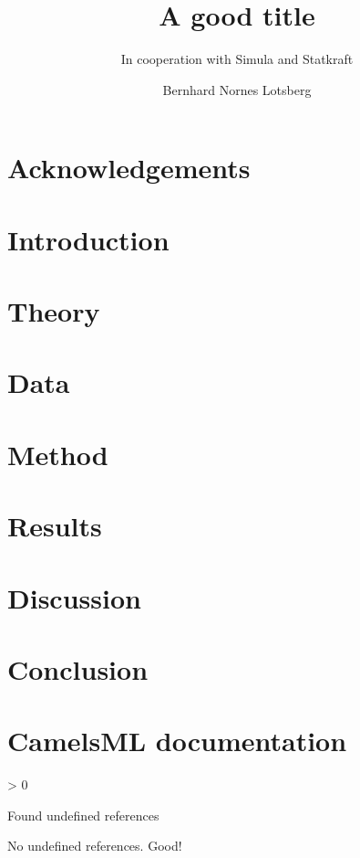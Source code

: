 \documentclass[10pt,a4paper,english, twoside]{report}
\title{A good title}
\subtitle{In cooperation with Simula and Statkraft}
\author{Bernhard Nornes Lotsberg}
\newcounter{undefinedreferences}
\newcommand{\checkreferences}{
	\ifnum\value{undefinedreferences} > 0
	\begin{center}
	\begin{Huge}
	Found undefined references
	\end{Huge}
	\end{center}
	\else
	No undefined references. Good!
	\fi
}
\begin{document}
\duoforside[
    dept={Department of Physics},
    program={Computational Science: physics},
    long]

%

\chapter*{Acknowledgements}
\thispagestyle{empty}

\clearpage


\setcounter{page}{1}
\tableofcontents
\listoffigures
\listoftables
\listoflistings

\chapter{Introduction}


\newpage
\chapter{Theory}


\newpage
\chapter{Data}
\label{data}


\newpage
\chapter{Method}
\label{Data}


\newpage
\chapter{Results} 


\newpage
\chapter{Discussion}


\newpage
\chapter{Conclusion}

\nocite{scikit-learn}



\newpage
\appendix
\chapter{CamelsML documentation}

\checkreferences
\end{document}
